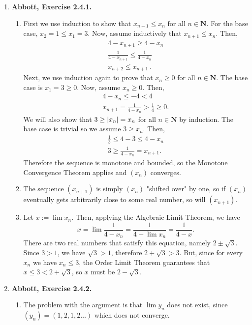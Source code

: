 \documentclass{article}
\DeclarePairedDelimiter\abs{\lvert}{\rvert}
\newcommand{\N}{\mathbf{N}}
\newcommand{\exc}[2][Abbott]{\item \textbf{#1, Exercise #2.}}
\begin{document}
\begin{enumerate}
    \exc{2.4.1}
    \begin{enumerate}
    	\item First we use induction to show that $x_{n+1} \leq x_n$ for all $n \in \N$. For the base case, $x_2 = 1 \leq x_1 = 3$. Now, assume inductively that $x_{n+1} \leq x_n$. Then, \begin{gather*}
    	      4-x_{n+1} \geq 4-x_n \\ 
    	      \frac{1}{4-x_{n+1}} \leq \frac{1}{4-x_n} \\ 
    	      x_{n+2} \leq x_{n+1} ~ .
    	\end{gather*}
    	Next, we use induction again to prove that $x_n \geq 0$ for all $n \in \N$. The base case is $x_1 = 3 \geq 0$. Now, assume $x_n \geq 0$. Then, \begin{gather*}
    	4-x_n \leq - 4 < 4 \\ 
    	x_{n+1} = \frac{1}{4-x_n} > \frac{1}{4} \geq 0.
    	\end{gather*} We will also show that $3 \geq \abs*{x_n} = x_n$ for all $n \in \N$ by induction. The base case is trivial so we assume $3 \geq x_n$. Then, \begin{gather*}
    	\frac{1}{3} \leq 4-3 \leq 4-x_n \\
    	3 \geq \frac{1}{4-x_n} = x_{n+1}.
    	\end{gather*} Therefore the sequence is monotone and bounded, so the Monotone Convergence Theorem applies and $(x_n)$ converges.
    		    	
    	\item The sequence $(x_{n+1})$ is simply $(x_n)$ "shifted over" by one, so if $(x_n)$ eventually gets arbitrarily close to some real number, so will $(x_{n+1})$.
    	
    	\item Let $x := \lim x_n$. Then, applying the Algebraic Limit Theorem, we have \begin{equation*}
    	    x = \lim \frac{1}{4-x_n} = \frac{1}{4-\lim x_n} = \frac{1}{4-x}.
    	\end{equation*} There are two real numbers that satisfy this equation, namely $2 \pm \sqrt{3}$. Since $3 > 1$, we have $\sqrt{3} > 1$, therefore $2 + \sqrt{3} > 3$. But, since for every $x_n$ we have $x_n \leq 3$, the Order Limit Theorem guarantees that $x \leq 3 < 2 + \sqrt{3}$, so $x$ must be $2 - \sqrt{3}$. 
    \end{enumerate} 
    
    \exc{2.4.2} 
    \begin{enumerate}
        \item  The problem with the argument is that $\lim y_n$ does not exist, since $(y_n) = (1,2,1,2 \dots)$ which does not converge.
        

\end{enumerate}
\end{enumerate}
\end{document}
